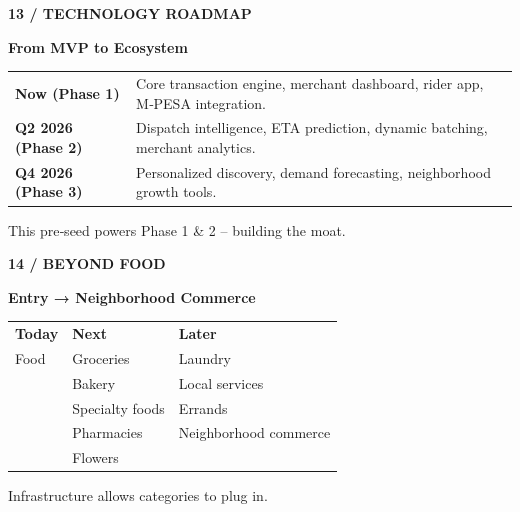 \documentclass[aspectratio=169,11pt]{beamer}
\begin{document}
\begin{frame}
\textsf{\scriptsize\bfseries\color{LinkBlue}\uppercase{13 / Technology Roadmap}}
\vspace{0.2cm}

{\fontsize{22}{28}\sffamily\bfseries\color{CorporateNavy} From MVP to Ecosystem}

\vspace{0.8cm}
\begin{tabularx}{\textwidth}{@{} p{2.5cm} X @{}}
    \textsf{\small\bfseries\color{LinkBlue} Now (Phase 1)} & \textsf{\small Core transaction engine, merchant dashboard, rider app, M‑PESA integration.} \\[0.3cm]
    \textsf{\small\bfseries\color{LinkBlue} Q2 2026 (Phase 2)} & \textsf{\small Dispatch intelligence, ETA prediction, dynamic batching, merchant analytics.} \\[0.3cm]
    \textsf{\small\bfseries\color{LinkBlue} Q4 2026 (Phase 3)} & \textsf{\small Personalized discovery, demand forecasting, neighborhood growth tools.}
\end{tabularx}
\vspace{0.4cm}
\textsf{\small This pre‑seed powers Phase 1 & 2 – building the moat.}
\end{frame}

\begin{frame}
\textsf{\scriptsize\bfseries\color{LinkBlue}\uppercase{14 / Beyond Food}}
\vspace{0.2cm}

{\fontsize{22}{28}\sffamily\bfseries\color{CorporateNavy} Entry → Neighborhood Commerce}

\vspace{0.8cm}
\begin{tabularx}{\textwidth}{@{} X X X @{}}
    \textsf{\small\bfseries\color{CorporateNavy} Today} & \textsf{\small\bfseries\color{CorporateNavy} Next} & \textsf{\small\bfseries\color{CorporateNavy} Later} \\
    \textsf{\small Food} & \textsf{\small Groceries} & \textsf{\small Laundry} \\
    & \textsf{\small Bakery} & \textsf{\small Local services} \\
    & \textsf{\small Specialty foods} & \textsf{\small Errands} \\
    & \textsf{\small Pharmacies} & \textsf{\small Neighborhood commerce} \\
    & \textsf{\small Flowers} & 
\end{tabularx}
\vspace{0.4cm}
\textsf{\small Infrastructure allows categories to plug in.}
\end{frame}
\end{document}
